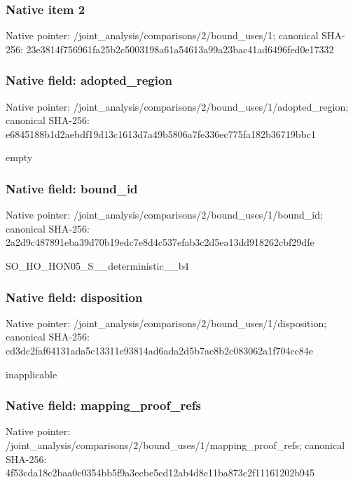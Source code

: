 \documentclass[10pt,a4paper]{article}
\begin{document}
\subsubsection{Native item 2}
Native pointer: /joint\_\allowbreak{}analysis/comparisons/2/bound\_\allowbreak{}uses/1; canonical SHA-256: 23e3814f756961fa25b2c5003198a61a54613a99a23bac41ad6496fed0e17332

\subsubsection{Native field: adopted\_\allowbreak{}region}
Native pointer: /joint\_\allowbreak{}analysis/comparisons/2/bound\_\allowbreak{}uses/1/adopted\_\allowbreak{}region; canonical SHA-256: e6845188b1d2aebdf19d13c1613d7a49b5806a7fe336ec775fa182b36719bbc1

\begingroup\raggedright\sloppy empty\par\endgroup

\subsubsection{Native field: bound\_\allowbreak{}id}
Native pointer: /joint\_\allowbreak{}analysis/comparisons/2/bound\_\allowbreak{}uses/1/bound\_\allowbreak{}id; canonical SHA-256: 2a2d9c487891eba39d70b19edc7e8d4c537efab3c2d5ea13dd918262cbf29dfe

\begingroup\raggedright\sloppy SO\_\allowbreak{}HO\_\allowbreak{}HON05\_\allowbreak{}S\_\allowbreak{}\_\allowbreak{}deterministic\_\allowbreak{}\_\allowbreak{}b4\par\endgroup

\subsubsection{Native field: disposition}
Native pointer: /joint\_\allowbreak{}analysis/comparisons/2/bound\_\allowbreak{}uses/1/disposition; canonical SHA-256: cd3dc2faf64131ada5c13311e93814ad6ada2d5b7ae8b2c083062a1f704cc84e

\begingroup\raggedright\sloppy inapplicable\par\endgroup

\subsubsection{Native field: mapping\_\allowbreak{}proof\_\allowbreak{}refs}
Native pointer: /joint\_\allowbreak{}analysis/comparisons/2/bound\_\allowbreak{}uses/1/mapping\_\allowbreak{}proof\_\allowbreak{}refs; canonical SHA-256: 4f53cda18c2baa0c0354bb5f9a3ecbe5ed12ab4d8e11ba873c2f11161202b945
\end{document}
